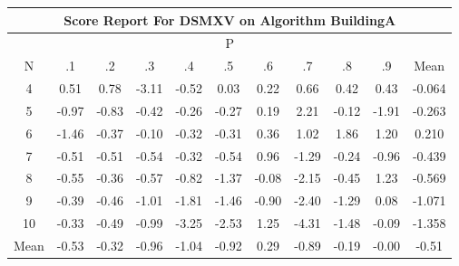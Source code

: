 \documentclass[11pt,a4paper]{report}
\begin{document}
\begin{longtable}{ | c || c | c | c | c | c | c | c | c | c || c |}
\hline
\multicolumn{11}{|c|}{ Score Report For DSMXV on Algorithm BuildingA} \\
\hline
\multicolumn{11}{|c|}{ P } \\
\hline
N & .1 & .2 & .3 & .4 & .5 & .6 & .7 & .8 & .9 & Mean\\
 \hline
 \hline
 \endhead
  4 &  \cellcolor[HTML]{EFEFFF} 0.51 &  \cellcolor[HTML]{EFEFFF} 0.78 &  \cellcolor[HTML]{FFAFAF} -3.11 &  \cellcolor[HTML]{FFEFEF} -0.52 &  \cellcolor[HTML]{FFFFFF} 0.03 &  \cellcolor[HTML]{F7F7FF} 0.22 &  \cellcolor[HTML]{EFEFFF} 0.66 &  \cellcolor[HTML]{F7F7FF} 0.42 &  \cellcolor[HTML]{F7F7FF} 0.43 & -0.064 \\
  5 &  \cellcolor[HTML]{FFE7E7} -0.97 &  \cellcolor[HTML]{FFE7E7} -0.83 &  \cellcolor[HTML]{FFF7F7} -0.42 &  \cellcolor[HTML]{FFF7F7} -0.26 &  \cellcolor[HTML]{FFF7F7} -0.27 &  \cellcolor[HTML]{F7F7FF} 0.19 &  \cellcolor[HTML]{C7C7FF} 2.21 &  \cellcolor[HTML]{FFFFFF} -0.12 &  \cellcolor[HTML]{FFCFCF} -1.91 & -0.263 \\
  6 &  \cellcolor[HTML]{FFD7D7} -1.46 &  \cellcolor[HTML]{FFF7F7} -0.37 &  \cellcolor[HTML]{FFFFFF} -0.10 &  \cellcolor[HTML]{FFF7F7} -0.32 &  \cellcolor[HTML]{FFF7F7} -0.31 &  \cellcolor[HTML]{F7F7FF} 0.36 &  \cellcolor[HTML]{E7E7FF} 1.02 &  \cellcolor[HTML]{CFCFFF} 1.86 &  \cellcolor[HTML]{DFDFFF} 1.20 & 0.210 \\
  7 &  \cellcolor[HTML]{FFEFEF} -0.51 &  \cellcolor[HTML]{FFEFEF} -0.51 &  \cellcolor[HTML]{FFEFEF} -0.54 &  \cellcolor[HTML]{FFF7F7} -0.32 &  \cellcolor[HTML]{FFEFEF} -0.54 &  \cellcolor[HTML]{E7E7FF} 0.96 &  \cellcolor[HTML]{FFDFDF} -1.29 &  \cellcolor[HTML]{FFF7F7} -0.24 &  \cellcolor[HTML]{FFE7E7} -0.96 & -0.439 \\
  8 &  \cellcolor[HTML]{FFEFEF} -0.55 &  \cellcolor[HTML]{FFF7F7} -0.36 &  \cellcolor[HTML]{FFEFEF} -0.57 &  \cellcolor[HTML]{FFE7E7} -0.82 &  \cellcolor[HTML]{FFDFDF} -1.37 &  \cellcolor[HTML]{FFFFFF} -0.08 &  \cellcolor[HTML]{FFC7C7} -2.15 &  \cellcolor[HTML]{FFF7F7} -0.45 &  \cellcolor[HTML]{DFDFFF} 1.23 & -0.569 \\
  9 &  \cellcolor[HTML]{FFF7F7} -0.39 &  \cellcolor[HTML]{FFF7F7} -0.46 &  \cellcolor[HTML]{FFE7E7} -1.01 &  \cellcolor[HTML]{FFCFCF} -1.81 &  \cellcolor[HTML]{FFD7D7} -1.46 &  \cellcolor[HTML]{FFE7E7} -0.90 &  \cellcolor[HTML]{FFBFBF} -2.40 &  \cellcolor[HTML]{FFDFDF} -1.29 &  \cellcolor[HTML]{FFFFFF} 0.08 & -1.071 \\
  10 &  \cellcolor[HTML]{FFF7F7} -0.33 &  \cellcolor[HTML]{FFEFEF} -0.49 &  \cellcolor[HTML]{FFE7E7} -0.99 &  \cellcolor[HTML]{FFAFAF} -3.25 &  \cellcolor[HTML]{FFBFBF} -2.53 &  \cellcolor[HTML]{DFDFFF} 1.25 &  \cellcolor[HTML]{FF8F8F} -4.31 &  \cellcolor[HTML]{FFD7D7} -1.48 &  \cellcolor[HTML]{FFFFFF} -0.09 & -1.358 \\
 \hline
 \hline
Mean &  \cellcolor[HTML]{FFEFEF} -0.53 &  \cellcolor[HTML]{FFF7F7} -0.32 &  \cellcolor[HTML]{FFE7E7} -0.96 &  \cellcolor[HTML]{FFE7E7} -1.04 &  \cellcolor[HTML]{FFE7E7} -0.92 &  \cellcolor[HTML]{F7F7FF} 0.29 &  \cellcolor[HTML]{FFE7E7} -0.89 &  \cellcolor[HTML]{FFF7F7} -0.19 &  \cellcolor[HTML]{FFFFFF} -0.00 &  \cellcolor[HTML]{FFEFEF} -0.51
\end{longtable}
\end{document}

